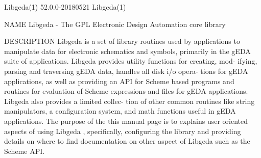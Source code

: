 Libgeda(1)                      52.0.0-20180521                     Libgeda(1)



NAME
       Libgeda - The GPL Electronic Design Automation core library

DESCRIPTION
       Libgeda is a set of library routines used by applications to manipulate
       data for electronic schematics and symbols, primarily in the gEDA suite
       of applications.  Libgeda provides utility functions for creating, mod-
       ifying, parsing and traversing gEDA data, handles all disk  i/o  opera-
       tions  for  gEDA  applications,  as well as providing an API for Scheme
       based programs and routines for evaluation of  Scheme  expressions  and
       files  for  gEDA applications.  Libgeda also provides a limited collec-
       tion of other common routines like string manipulators, a configuration
       system,  and math functions useful in gEDA applications. The purpose of
       the this manual page is to explains  user  oriented  aspects  of  using
       Libgeda  ,  specifically, configuring the library and providing details
       on where to find documentation on other aspect of Libgeda such  as  the
       Scheme API.

